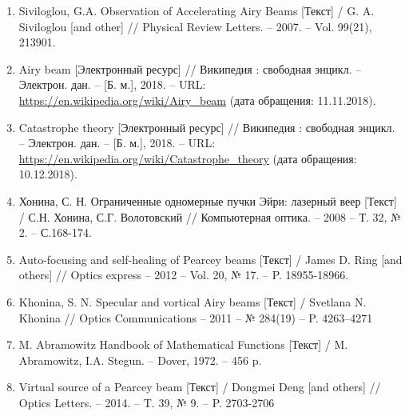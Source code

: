    \def\bibindent{-1cm}
    \renewcommand\refname{Список использованных источников}

    \begin{enumerate}[label=\arabic*]

        \item
        Siviloglou, G.A. Observation of Accelerating Airy Beams [Текст] / G. A.
        Siviloglou [and other] // Physical Review Letters. -- 2007. -- Vol. 99(21), 213901. \label{first_airy}

        \item
        Airy beam [Электронный ресурс] // Википедия : свободная энцикл. –
        Электрон. дан. – [Б. м.], 2018. – URL: \url{https://en.wikipedia.org/wiki/Airy_beam} (дата обращения: 11.11.2018). \label{airy_wiki}


        \item
        Catastrophe theory [Электронный ресурс] // Википедия : свободная
        энцикл. – Электрон. дан. – [Б. м.], 2018. – URL:  \url{https://en.wikipedia.org/wiki/Catastrophe_theory}  (дата обращения: 10.12.2018). \label{catastrophe}



        \item
        Хонина, С. Н. Ограниченные одномерные пучки Эйри: лазерный веер
        [Текст] / С.Н. Хонина, С.Г. Волотовский // Компьютерная оптика. – 2008 – Т.
        32, № 2. – С.168-174. \label{Khonina_2008}

        \item Auto-focusing and self-healing of Pearcey beams [Текст]
        / James D. Ring [and others] // Optics express -- 2012 -- Vol. 20, № 17. -- P. 18955-18966. \label{pe_selfheal}


        \item
        Khonina, S. N. Specular and vortical Airy beams [Текст] / Svetlana N.
        Khonina // Optics Communications – 2011 – № 284(19) – P. 4263–4271 \label{Khonina_2011}

        \item
        M. Abramowitz Handbook of Mathematical Functions [Текст] / M.
        Abramowitz, I.A. Stegun. – Dover, 1972. – 456 p. \label{math_func}

        \item
        Virtual source of a Pearcey beam [Текст] / Dongmei Deng [and others] // Optics Letters. – 2014. –
        T. 39, № 9. – P. 2703-2706 \label{pe_art}


\end{enumerate}
